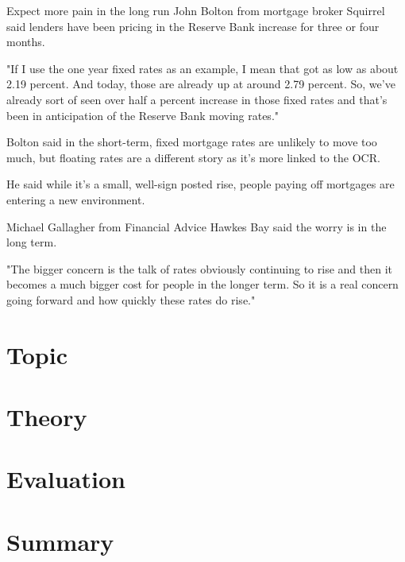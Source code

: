 \documentclass[a4paper,12pt]{article}
\begin{document}
Expect more pain in the long run
John Bolton from mortgage broker Squirrel said lenders have been pricing in the Reserve Bank increase for three or four months.

"If I use the one year fixed rates as an example, I mean that got as low as about 2.19 percent. And today, those are already up at around 2.79 percent. So, we've already sort of seen over half a percent increase in those fixed rates and that's been in anticipation of the Reserve Bank moving rates."

Bolton said in the short-term, fixed mortgage rates are unlikely to move too much, but floating rates are a different story as it's more linked to the OCR.

He said while it's a small, well-sign posted rise, people paying off mortgages are entering a new environment.

Michael Gallagher from Financial Advice Hawkes Bay said the worry is in the long term.

"The bigger concern is the talk of rates obviously continuing to rise and then it becomes a much bigger cost for people in the longer term. So it is a real concern going forward and how quickly these rates do rise."

\newpage
\section*{Topic}
\section*{Theory}

\section*{Evaluation}

\section*{Summary}
\end{document}
